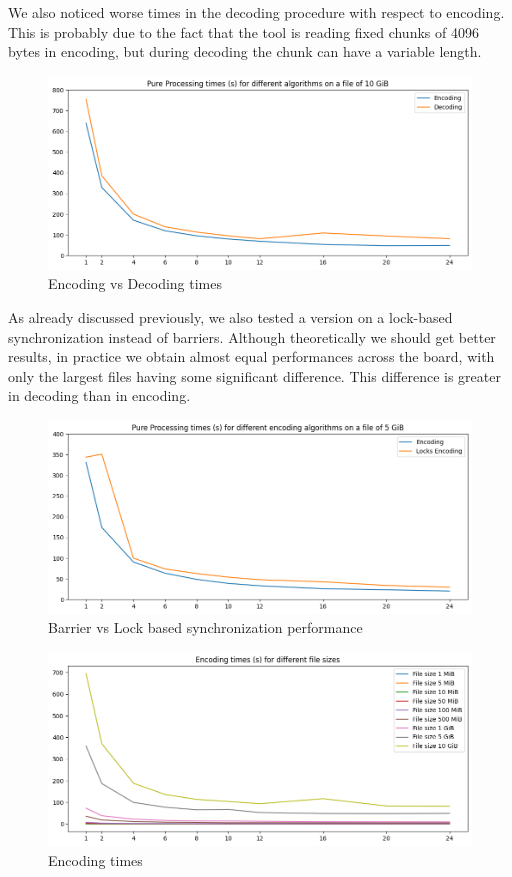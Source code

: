 We also noticed worse times in the decoding procedure with respect to encoding. This is probably due to the fact that the tool is reading fixed chunks of 4096 bytes in encoding, but during decoding the chunk can have a variable length.

\begin{figure}
	\centering
	\includegraphics[width=0.8\linewidth]{"../imgs/Encoding vs Decoding"}
	\caption{Encoding vs Decoding times}
	\label{fig:encoding-vs-decoding}
\end{figure}

As already discussed previously, we also tested a version on a lock-based synchronization instead of barriers. Although theoretically we should get better results, in practice we obtain almost equal performances across the board, with only the largest files having some significant difference. This difference is greater in decoding than in encoding.
\begin{figure}
	\centering
	\includegraphics[width=0.8\linewidth]{"../imgs/Barrier vs Locks encoding"}
	\caption{Barrier vs Lock based synchronization performance}
	\label{fig:barrier-vs-locks-encoding}
\end{figure}

\begin{figure}
	\centering
	\includegraphics[width=0.8\linewidth]{"../imgs/Encoding Barrier times"}
	\caption{Encoding times}
	\label{fig:encoding-barrier-times}
\end{figure}

